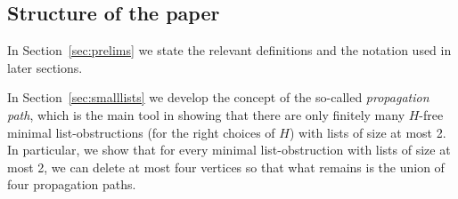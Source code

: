 \documentclass[11pt]{article}
\begin{document}

\subsection{Structure of the paper}

In Section~\ref{sec:prelims} we state the relevant definitions and the notation used in later sections.

In Section~\ref{sec:smalllists} 
we develop the  concept of the so-called \emph{propagation path}, which is 
the main tool in showing  that there are only finitely many $H$-free minimal list-obstructions (for the right choices of $H$) with lists of size at most 2.
In particular, we show that for every minimal list-obstruction with lists of
size at most 2, we can delete at most four vertices so that what remains  is the union of four propagation paths.
\end{document}
